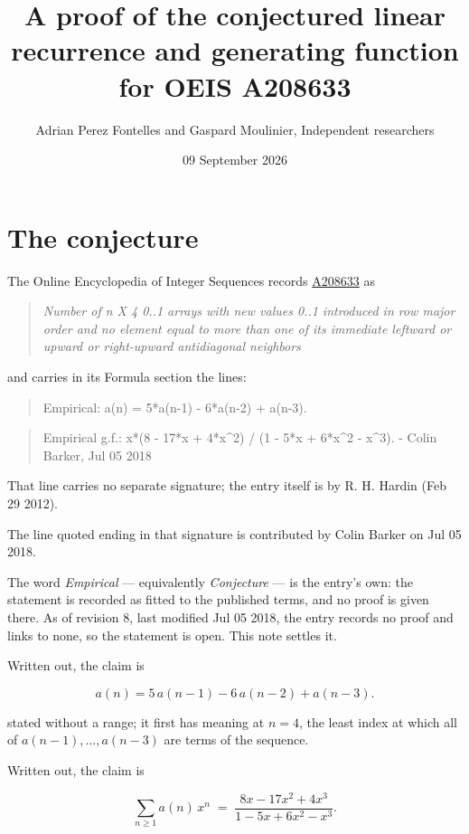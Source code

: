 \documentclass[11pt]{article}
\title{A proof of the conjectured linear recurrence and generating function for OEIS A208633}
\author{Adrian Perez Fontelles and Gaspard Moulinier, Independent researchers}
\date{09 September 2026}
\theoremstyle{definition}
\begin{document}
\maketitle
\section{The conjecture}

The Online Encyclopedia of Integer Sequences records \href{https://oeis.org/A208633}{A208633} as

\begin{quote}\itshape Number of n X 4 0..1 arrays with new values 0..1 introduced in row major order and no element equal to more than one of its immediate leftward or upward or right-upward antidiagonal neighbors\end{quote}

and carries in its Formula section the lines:

\begin{quote}\ttfamily Empirical: a(n) = 5*a(n-1) - 6*a(n-2) + a(n-3).\end{quote}

\begin{quote}\ttfamily Empirical g.f.: x*(8 - 17*x + 4*x\textasciicircum{}2) / (1 - 5*x + 6*x\textasciicircum{}2 - x\textasciicircum{}3). - Colin Barker, Jul 05 2018\end{quote}

That line carries no separate signature; the entry itself is by R. H. Hardin (Feb 29 2012).

The line quoted ending in that signature is contributed by Colin Barker on Jul 05 2018.

The word {\itshape Empirical} --- equivalently {\itshape Conjecture} --- is the entry's own: the statement is recorded as fitted to the published terms, and no proof is given there. As of revision 8, last modified Jul 05 2018, the entry records no proof and links to none, so the statement is open. This note settles it.

Written out, the claim is

\[a(n) = 5\,a(n-1) - 6\,a(n-2) + a(n-3).\]

stated without a range; it first has meaning at $n = 4$, the least index at which all of $a(n-1),\dots,a(n-3)$ are terms of the sequence.

Written out, the claim is

\[\sum_{n \ge 1} a(n)\,x^n \;=\; \frac{8x - 17x^{2} + 4x^{3}}{1 - 5x + 6x^{2} - x^{3}}.\]
\end{document}
